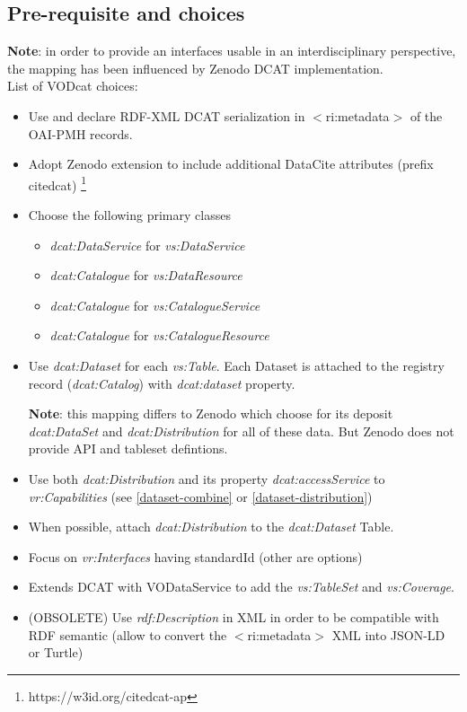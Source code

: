 \documentclass[11pt,a4paper]{ivoa}
\begin{document}
\subsection{Pre-requisite and choices}

\textbf{Note}: in order to provide an interfaces usable in an interdisciplinary perspective, the mapping has been influenced by Zenodo DCAT implementation.\\

List of VODcat choices:

\begin{itemize}
	\item Use and declare RDF-XML DCAT serialization in $<$ri:metadata$>$ of the OAI-PMH records.
	\item Adopt Zenodo extension to include additional DataCite attributes (prefix citedcat) \footnote{https://w3id.org/citedcat-ap}
	\item Choose the following primary classes 
	    \begin{itemize}
		\item \textit{dcat:DataService} for \textit{vs:DataService}
		\item \textit{dcat:Catalogue} for \textit{vs:DataResource}
		\item \textit{dcat:Catalogue} for \textit{vs:CatalogueService}
		\item \textit{dcat:Catalogue} for \textit{vs:CatalogueResource}
		\end{itemize}
	\item Use \textit{dcat:Dataset} for each \textit{vs:Table}. Each Dataset is attached to the registry record (\textit{dcat:Catalog}) with  \textit{dcat:dataset} property.
	
	\textbf{Note}: this mapping differs to Zenodo which choose for its deposit \textit{dcat:DataSet} and \textit{dcat:Distribution} for all of these data. But Zenodo does not provide API and tableset defintions. 

	\item Use both \textit{dcat:Distribution} and its property \textit{dcat:accessService} to \textit{vr:Capabilities} (see \ref{dataset-combine} or \ref{dataset-distribution})

	
	\item When possible, attach \textit{dcat:Distribution} to the \textit{dcat:Dataset} Table.
	
	\item Focus on  \textit{vr:Interfaces} having standardId (other are options)
	\item Extends DCAT with VODataService to add the \textit{vs:TableSet} and \textit{vs:Coverage}.
	
    \item (OBSOLETE) Use \textit{rdf:Description} in XML in order to be compatible with RDF semantic (allow to convert the $<$ri:metadata$>$ XML into JSON-LD or Turtle)

\end{itemize}
\end{document}
